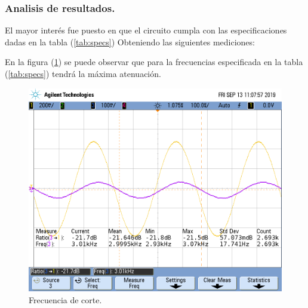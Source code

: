 \documentclass[a4paper]{article}
\begin{document}
\subsubsection{Analisis de resultados.}

El mayor interés fue puesto en que el circuito cumpla con las especificaciones dadas en la tabla (\ref{tab:specs})
Obteniendo las siguientes mediciones:

En la figura (\ref{fig:fcbr}) se puede observar que para la frecuencias especificada en la tabla (\ref{tab:specs}) tendrá la máxima atenuación.
\begin{figure}[H]	
	\centering
	\includegraphics[width=\textwidth]{ImagenesEj2/MedicionesGrilla/fc_br.png}
	\caption{Frecuencia de corte.}
	\label{fig:fcbr}
\end{figure}
\newpage
\end{document}
